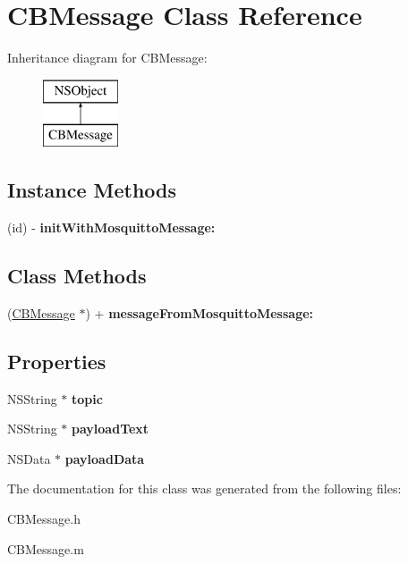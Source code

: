 \hypertarget{interface_c_b_message}{\section{C\-B\-Message Class Reference}
\label{interface_c_b_message}
}
Inheritance diagram for C\-B\-Message\-:\begin{figure}[H]
\begin{center}
\leavevmode
\includegraphics[height=2.000000cm]{interface_c_b_message}
\end{center}
\end{figure}
\subsection*{Instance Methods}
\begin{DoxyCompactItemize}
\item 
\hypertarget{interface_c_b_message_a38d3e9a65419e27551d38a7628995fb7}{(id) -\/ {\bfseries init\-With\-Mosquitto\-Message\-:}}\label{interface_c_b_message_a38d3e9a65419e27551d38a7628995fb7}

\end{DoxyCompactItemize}
\subsection*{Class Methods}
\begin{DoxyCompactItemize}
\item 
\hypertarget{interface_c_b_message_a3413a6c31ec75df51d2934f5ec58f0db}{(\hyperlink{interface_c_b_message}{C\-B\-Message} $\ast$) + {\bfseries message\-From\-Mosquitto\-Message\-:}}\label{interface_c_b_message_a3413a6c31ec75df51d2934f5ec58f0db}

\end{DoxyCompactItemize}
\subsection*{Properties}
\begin{DoxyCompactItemize}
\item 
\hypertarget{interface_c_b_message_a5fef01f2b51495307023ad95e772c632}{N\-S\-String $\ast$ {\bfseries topic}}\label{interface_c_b_message_a5fef01f2b51495307023ad95e772c632}

\item 
\hypertarget{interface_c_b_message_a40254070a83d97673d850d08437fc44b}{N\-S\-String $\ast$ {\bfseries payload\-Text}}\label{interface_c_b_message_a40254070a83d97673d850d08437fc44b}

\item 
\hypertarget{interface_c_b_message_a11c9f8c3e5d3e137f6d735ffb3fa7560}{N\-S\-Data $\ast$ {\bfseries payload\-Data}}\label{interface_c_b_message_a11c9f8c3e5d3e137f6d735ffb3fa7560}

\end{DoxyCompactItemize}


The documentation for this class was generated from the following files\-:\begin{DoxyCompactItemize}
\item 
C\-B\-Message.\-h\item 
C\-B\-Message.\-m\end{DoxyCompactItemize}
